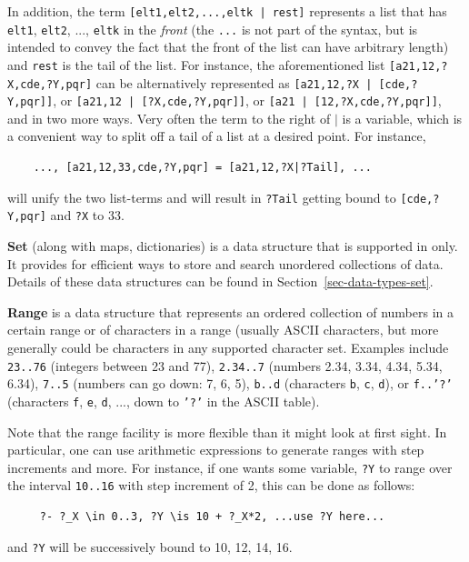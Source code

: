 \documentclass[11pt]{article}
\newcommand{\ERGO}{\mbox{\smaller{\ensuremath{\cal{E}}\smaller{{\sc{RGO}}}}}\xspace}
\begin{document}
In addition, the term \texttt{[elt1,elt2,...,eltk |
rest]} represents a list that has \texttt{elt1}, \texttt{elt2}, ...,
\texttt{eltk} in the \emph{front}
(the \texttt{...} is not part of the syntax, but is intended
to convey the fact that the front of the list can have arbitrary length)      
and \texttt{rest} is the tail of the list. For instance, the aforementioned list
\texttt{[a21,12,?X,cde,?Y,pqr]} can be alternatively represented as
\texttt{[a21,12,?X | [cde,?Y,pqr]]}, or \texttt{[a21,12 | [?X,cde,?Y,pqr]]},
or \texttt{[a21 | [12,?X,cde,?Y,pqr]]}, and in two more ways.  Very often
the term to the right of $\mid$ is a variable, which is a convenient way to
split off a tail of a list at a desired point. For instance,
\begin{verbatim}
    ..., [a21,12,33,cde,?Y,pqr] = [a21,12,?X|?Tail], ...
\end{verbatim}
will unify the two list-terms and will result in \texttt{?Tail} getting
bound to \texttt{[cde,?Y,pqr]} and \texttt{?X} to 33.   

\noindent
\textbf{Set} (along with maps, dictionaries) is a data structure that is
supported in \ERGO only. It provides for efficient ways to store and search
unordered collections of data.
Details of these data structures can be found in
Section~\ref{sec-data-types-set}.

\noindent
\textbf{Range} is a data structure that represents an ordered collection of
numbers in a certain range or of characters in a range (usually ASCII
characters, but more generally could be characters in any supported
character set. Examples include  \texttt{23..76} (integers between 23 and 77),
\texttt{2.34..7} (numbers 2.34, 3.34, 4.34, 5.34, 6.34),  \texttt{7..5}
(numbers can go down: 7, 6, 5),  \texttt{b..d} (characters \texttt{b}, \texttt{c},
\texttt{d}), or  \texttt{f..'?'} (characters \texttt{f}, \texttt{e},
\texttt{d}, ..., down to \texttt{'?'} in the ASCII table).         

Note that the range facility is more flexible than it might look at first
sight. In particular, one can use arithmetic expressions to generate ranges
with step increments and more. For instance, if one wants some variable,
\texttt{?Y} to range over the interval \texttt{10..16} with step increment
of 2, this can be done as follows:
\begin{verbatim}
     ?- ?_X \in 0..3, ?Y \is 10 + ?_X*2, ...use ?Y here...
\end{verbatim}
and \texttt{?Y} will be successively bound to 10, 12, 14, 16. 
\end{document}

